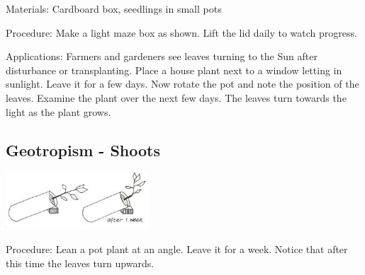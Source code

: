 \begin{multicols}{2}
\begin{description*}
\item[Materials:]{Cardboard box, seedlings in small pots}
\item[Procedure:]{Make a light maze box as shown. Lift the lid daily to watch progress.}
\item[Applications:]{Farmers and gardeners see leaves turning to the Sun after disturbance
or transplanting. Place a house plant next to a window letting in
sunlight. Leave it for a few days. Now rotate the pot and note the
position of the leaves. Examine the plant over the next few days. The
leaves turn towards the light as the plant grows.}
\end{description*}

\subsection{Geotropism - Shoots}

\begin{center}
\includegraphics[width=0.4\textwidth]{./img/vso/geotropism-shoots.jpg}
\end{center}

\begin{description*}
\item[Procedure:]{Lean a pot plant at an angle.
Leave it for a week. Notice that
after this time the leaves turn
upwards.}
\end{description*}


\end{multicols}
